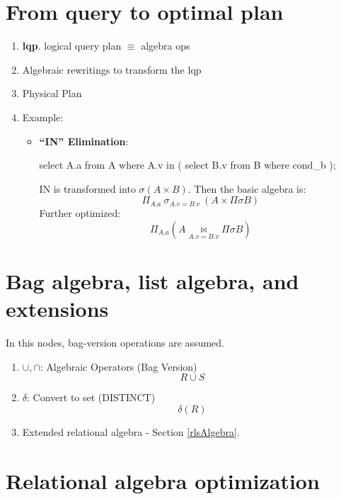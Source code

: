 \documentclass[a4paper]{report}
\begin{document}
\section{From query to optimal plan}
\begin{enumerate}
\item \textbf{lqp}. logical query plan $\equiv$ algebra ops 
\item Algebraic rewritings to transform the lqp
\item Physical Plan
\item Example:
\begin{itemize}
\item \textbf{``IN'' Elimination}: 
\begin{pseudo}
select A.a
from A where A.v in (
    select B.v from B where cond_b
);
\end{pseudo}
IN is transformed into $\sigma (A\times B)$. Then the basic algebra is:
$$
\Pi_{A.a}\ \sigma_{A.v=B.v}\ (A \times \Pi \sigma B)
$$
Further optimized:
$$
\Pi_{A.a}(A \underset{A.v=B.v}\bowtie \Pi \sigma B)
$$

\end{itemize}
\end{enumerate}
\section{Bag algebra, list algebra, and extensions}
In this nodes, bag-version operations are assumed. 
\begin{enumerate}
\item $\cup, \cap$: Algebraic Operators (Bag Version)
$$
R\cup S
$$
\item $\delta$: Convert to set (DISTINCT)
$$
\delta(R)
$$
\item Extended relational algebra - Section \ref{rlsAlgebra}.
\end{enumerate}
\section{Relational algebra optimization}
\end{document}
